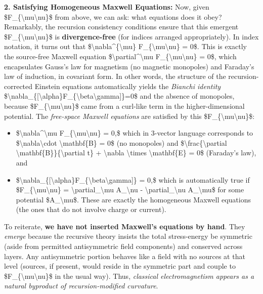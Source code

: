 \textbf{2. Satisfying Homogeneous Maxwell Equations:} Now, given
\$F\_\{\textbackslash{}mu\textbackslash{}nu\}\$ from above, we can ask:
what equations does it obey? Remarkably, the recursion consistency
conditions ensure that this emergent
\$F\_\{\textbackslash{}mu\textbackslash{}nu\}\$ is
\textbf{divergence-free} (for indices arranged appropriately). In index
notation, it turns out that
\$\textbackslash{}nabla\^{}\{\textbackslash{}mu\}
F\_\{\textbackslash{}mu\textbackslash{}nu\} = 0\$​. This is exactly the
source-free Maxwell equation
\$\textbackslash{}partial\^{}\textbackslash{}mu
F\_\{\textbackslash{}mu\textbackslash{}nu\} = 0\$, which encapsulates
Gauss's law for magnetism (no magnetic monopoles) and Faraday's law of
induction, in covariant form. In other words, the structure of the
recursion-corrected Einstein equations automatically yields the
\emph{Bianchi identity}
\$\textbackslash{}nabla\_\{{[}\textbackslash{}alpha\}F\_\{\textbackslash{}beta\textbackslash{}gamma{]}\}=0\$
and the absence of monopoles, because
\$F\_\{\textbackslash{}mu\textbackslash{}nu\}\$ came from a curl-like
term in the higher-dimensional potential​. The \emph{free-space Maxwell
equations} are satisfied by this
\$F\_\{\textbackslash{}mu\textbackslash{}nu\}\$:

\begin{itemize}
\item
  \$\textbackslash{}nabla\^{}\textbackslash{}mu
  F\_\{\textbackslash{}mu\textbackslash{}nu\} = 0,\$ which in 3-vector
  language corresponds to \$\textbackslash{}nabla\textbackslash{}cdot
  \textbackslash{}mathbf\{B\} = 0\$ (no monopoles) and
  \$\textbackslash{}frac\{\textbackslash{}partial
  \textbackslash{}mathbf\{B\}\}\{\textbackslash{}partial t\} +
  \textbackslash{}nabla \textbackslash{}times
  \textbackslash{}mathbf\{E\} = 0\$ (Faraday's law), and
\item
  \$\textbackslash{}nabla\_\{{[}\textbackslash{}alpha\}F\_\{\textbackslash{}beta\textbackslash{}gamma{]}\}
  = 0,\$ which is automatically true if
  \$F\_\{\textbackslash{}mu\textbackslash{}nu\} =
  \textbackslash{}partial\_\textbackslash{}mu A\_\textbackslash{}nu -
  \textbackslash{}partial\_\textbackslash{}nu A\_\textbackslash{}mu\$
  for some potential \$A\_\textbackslash{}mu\$. These are exactly the
  homogeneous Maxwell equations (the ones that do not involve charge or
  current)​.
\end{itemize}

To reiterate, \textbf{we have not inserted Maxwell's equations by hand}.
They \emph{emerge} because the recursive theory insists the total
stress-energy be symmetric (aside from permitted antisymmetric field
components) and conserved across layers. Any antisymmetric portion
behaves like a field with no sources at that level (sources, if present,
would reside in the symmetric part and couple to
\$F\_\{\textbackslash{}mu\textbackslash{}nu\}\$ in the usual way). Thus,
\emph{classical electromagnetism appears as a natural byproduct of
recursion-modified curvature}​.

